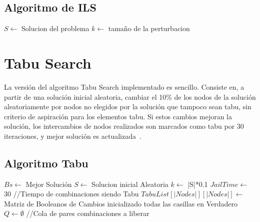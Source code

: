 \documentclass{ci5652}
\begin{document}
\subsection{Algoritmo de ILS}
\begin{algorithm}[h!]
\DontPrintSemicolon
$S \leftarrow$ Solucion del problema\;
$k \leftarrow$ tamaño de la perturbacion\;
\end{algorithm}

\section{Tabu Search}
La versión del algoritmo Tabu Search implementado es sencillo. Consiste en, a partir de una solución inicial aleatoria, cambiar el 10\% de los nodos de la solución aleatoriamente por nodos no elegidos por la solución que tampoco sean tabu, sin criterio de aspiración para los elementos tabu. Si estos cambios mejoran la solución, los intercambios de nodos realizados son marcados como tabu por 30 iteraciones, y mejor solución es actualizada~\cite{fgtabu}.

\subsection{Algoritmo Tabu}
\begin{algorithm}[h!]
\DontPrintSemicolon
$Bs\leftarrow$ Mejor Solución\;
$S \leftarrow$ Solucion inicial Aleatoria\;
$k \leftarrow$ |S|*0.1\;
$JailTime \leftarrow$ 30 //Tiempo de combinaciones siendo Tabu\;
$TabuList[|Nodes|][|Nodes|] \leftarrow$ Matriz de Booleanos de Cambios inicializado todas las casillas en Verdadero\;
$Q \leftarrow \emptyset$ //Cola de pares combinaciones a liberar\;
\end{algorithm}
\end{document}
